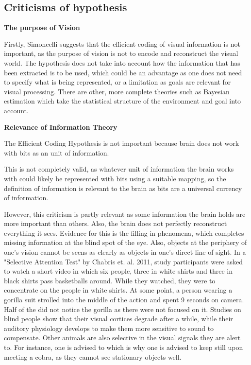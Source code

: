 \documentclass[twoside]{article}
\begin{document}
\begin{multicols}{2}
\subsection{Criticisms of hypothesis}

\noindent\textbf{The purpose of Vision}

Firstly, Simoncelli suggests that the efficient coding of visual information is not important, as the purpose of vision is not to encode and reconstruct the visual world. The hypothesis does not take into account how the information that has been extracted is to be used, which could be an advantage as one does not need to specify what is being represented, or a limitation as goals are relevant for visual processing. There are other, more complete theories such as Bayesian estimation which take the statistical structure of the environment and goal into account.

\noindent\textbf{Relevance of Information Theory}

The Efficient Coding Hypothesis is not important because brain does not work with bits as an unit of information. 

This is not completely valid, as whatever unit of information the brain works with could likely be represented with bits using a suitable mapping, so the definition of information is relevant to the brain as bits are a universal currency of information.

However, this criticism is partly relevant as some information the brain holds are more important than others. Also, the brain does not perfectly reconstruct everything it sees. Evidence for this is the filling-in phenomena, which completes missing information at the blind spot of the eye. Also, objects at the periphery of one's vision cannot be seens as clearly as objects in one's direct line of sight. In a "Selective Attention Test" by Chabris et. al. 2011, study participants were asked to watch a short video in which six people, three in white shirts and three in black shirts pass basketballs around. While they watched, they were to concentrate on the people in white shirts. At some point, a person wearing a  gorilla suit strolled into the middle of the action and spent 9 seconds on camera. Half of the did not notice the gorilla as there were not focused on it. Studies on blind people show that their visual cortices degrade after a while, while their auditory physiology develops to make them more sensitive to sound to compensate. Other animals are also selective in the visual signals they are alert to. For instance, one is advised to which is why one is advised to keep still upon meeting a cobra, as they cannot see stationary objects well. 


\end{multicols}
\end{document}
